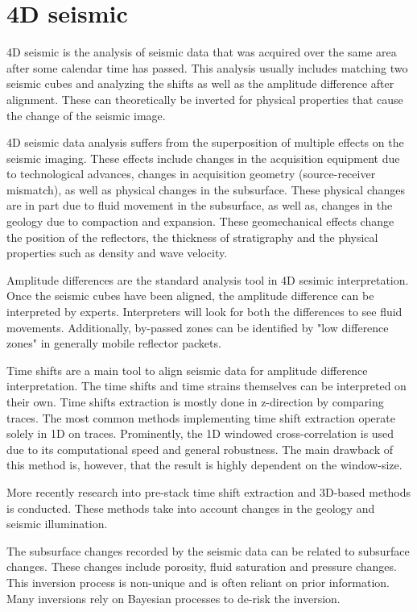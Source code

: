 \section{4D seismic}


4D seismic is the analysis of seismic data that was acquired over the same area after some calendar time has passed. This analysis usually includes matching two seismic cubes and analyzing the shifts as well as the amplitude difference after alignment. These can theoretically be inverted for physical properties that cause the change of the seismic image.

4D seismic data analysis suffers from the superposition of multiple effects on the seismic imaging. These effects include changes in the acquisition equipment due to technological advances, changes in acquisition geometry (source-receiver mismatch), as well as physical changes in the subsurface. These physical changes are in part due to fluid movement in the subsurface, as well as, changes in the geology due to compaction and expansion. These geomechanical effects change the position of the reflectors, the thickness of stratigraphy and the physical properties such as density and wave velocity.


Amplitude differences are the standard analysis tool in 4D sesimic interpretation. Once the seismic cubes have been aligned, the amplitude difference can be interpreted by experts. Interpreters will look for both the differences to see fluid movements. Additionally, by-passed zones can be identified by "low difference zones" in generally mobile reflector packets.

Time shifts are a main tool to align seismic data for amplitude difference interpretation. The time shifts and time strains themselves can be interpreted on their own. Time shifts extraction is mostly done in z-direction by comparing traces. The most common methods implementing time shift extraction operate solely in 1D on traces. Prominently, the 1D windowed cross-correlation is used due to its computational speed and general robustness. The main drawback of this method is, however, that the result is highly dependent on the window-size. 

More recently research into pre-stack time shift extraction and 3D-based methods is conducted. These methods take into account changes in the geology and seismic illumination.

The subsurface changes recorded by the seismic data can be related to subsurface changes. These changes include porosity, fluid saturation and pressure changes. This inversion process is non-unique and is often reliant on prior information. Many inversions rely on Bayesian processes to de-risk the inversion. 
